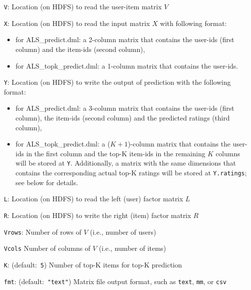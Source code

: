   \begin{Description}
  	\item[{\tt V}:]
  	Location (on HDFS) to read the user-item matrix $V$ 
  	\item[{\tt X}:]
  	Location (on HDFS) to read the input matrix $X$ with following format:
  	\begin{itemize}
  		\item for {ALS\_predict.dml}: a 2-column matrix that contains the user-ids (first column) and the item-ids (second column),
  		\item for {ALS\_topk\_predict.dml}: a 1-column matrix that contains the user-ids.
  	\end{itemize} 
  	\item[{\tt Y}:]
  	Location (on HDFS) to write the output of prediction with the following format:
  	\begin{itemize}
  		\item for {ALS\_predict.dml}: a 3-column matrix that contains the user-ids (first column), the item-ids (second column) and the predicted ratings (third column),
  		\item for {ALS\_topk\_predict.dml}: a ($K+1$)-column matrix that contains the user-ids in the first column and the top-K item-ids in the remaining $K$ columns will be stored at {\tt Y}.
  		Additionally, a matrix with the same dimensions that contains the corresponding actual top-K ratings will be stored at {\tt Y.ratings}; see below for details. 
  	\end{itemize}
  	\item[{\tt L}:]
  	Location (on HDFS) to read the left (user) factor matrix $L$
  	\item[{\tt R}:]
  	Location (on HDFS) to write the right (item) factor matrix $R$
   	\item[{\tt Vrows}:] 
   	Number of rows of $V$ (i.e., number of users)
   	\item[{\tt Vcols}] 
   	Number of columns of $V$ (i.e., number of items) 
  	\item[{\tt K}:] (default:\mbox{ }{\tt 5})
  	Number of top-K items for top-K prediction
  	\item[{\tt fmt}:] (default:\mbox{ }{\tt "text"})
  	Matrix file output format, such as {\tt text}, {\tt mm}, or {\tt csv}
  \end{Description}
  
